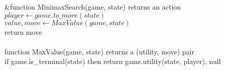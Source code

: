 \documentclass[preview]{standalone}
\begin{document}
\begin{center}
&function MinimaxSearch(game, state) returns an action\\$player \gets game.to\_move(state)$\\$value, move \gets MaxValue(game, state)$\\return move\\\\function MaxValue(game, state) returns a (utility, move) pair\\if game.is\_terminal(state) then return game.utility(state, player), null
\end{center}
\end{document}
